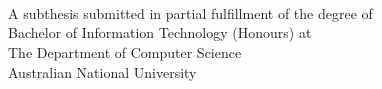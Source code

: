 
\begin{titlepage}
  \enlargethispage{2cm}
  \begin{center}
    \makeatletter
    \Huge\textbf{\@title} \\[.4cm]
    \Huge\textbf{\thesisqualifier} \\[2.5cm]
    \huge\textbf{\@author} \\[8.5cm]
    \makeatother
    \Large A subthesis submitted in partial fulfillment of the degree of \\
    \LARGE Bachelor of Information Technology (Honours) at \\
    The Department of Computer Science\\
    Australian National University \\[2cm]
    \thismonth
  \end{center}
\end{titlepage}

